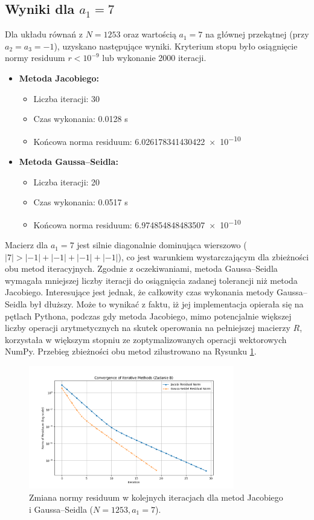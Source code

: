 \documentclass[a4paper, 11pt]{article}
\begin{document}
\subsection{Wyniki dla $a_1=7$}
Dla układu równań z $N=1253$ oraz wartością $a_1=7$ na głównej przekątnej (przy $a_2=a_3=-1$), uzyskano następujące wyniki. Kryterium stopu było osiągnięcie normy residuum $r < 10^{-9}$ lub wykonanie 2000 iteracji.
\begin{itemize}
    \item \textbf{Metoda Jacobiego:}
    \begin{itemize}
        \item Liczba iteracji: 30
        \item Czas wykonania: \num{0.0128} s
        \item Końcowa norma residuum: \num{6.026178341430422e-10}
    \end{itemize}
    \item \textbf{Metoda Gaussa–Seidla:}
    \begin{itemize}
        \item Liczba iteracji: 20
        \item Czas wykonania: \num{0.0517} s
        \item Końcowa norma residuum: \num{6.974854848483507e-10}
    \end{itemize}
\end{itemize}
Macierz dla $a_1=7$ jest silnie diagonalnie dominująca wierszowo ($|7| > |-1|+|-1|+|-1|+|-1|$), co jest warunkiem wystarczającym dla zbieżności obu metod iteracyjnych. Zgodnie z oczekiwaniami, metoda Gaussa–Seidla wymagała mniejszej liczby iteracji do osiągnięcia zadanej tolerancji niż metoda Jacobiego. Interesujące jest jednak, że całkowity czas wykonania metody Gaussa–Seidla był dłuższy. Może to wynikać z faktu, iż jej implementacja opierała się na pętlach Pythona, podczas gdy metoda Jacobiego, mimo potencjalnie większej liczby operacji arytmetycznych na skutek operowania na pełniejszej macierzy $R$, korzystała w większym stopniu ze zoptymalizowanych operacji wektorowych NumPy. Przebieg zbieżności obu metod zilustrowano na Rysunku \ref{fig:task_b_convergence}.

\begin{figure}[H]
    \centering
    \includegraphics[width=0.8\textwidth]{residuals_plot_B}
    \caption{Zmiana normy residuum w kolejnych iteracjach dla metod Jacobiego i Gaussa–Seidla ($N=1253, a_1=7$).}
    \label{fig:task_b_convergence}
\end{figure}
\end{document}
